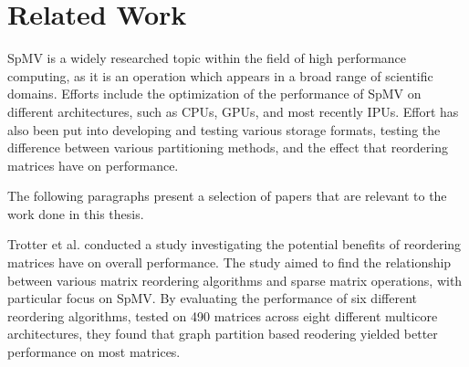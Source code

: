 \chapter{Related Work}
SpMV is a widely researched topic within the field of high performance computing, as it is an operation which appears in a broad range of scientific domains. Efforts include the optimization of the performance of SpMV on different architectures, such as CPUs, GPUs, and most recently IPUs. Effort has also been put into developing and testing various storage formats, testing the difference between various partitioning methods, and the effect that reordering matrices have on performance.
\medskip

The following paragraphs present a selection of papers that are relevant to the work done in this thesis.
\medskip

Trotter et al. \cite{ordersparse} conducted a study investigating the potential benefits of reordering matrices have on overall performance. The study aimed to find the relationship between various matrix reordering algorithms and sparse matrix operations, with particular focus on SpMV. By evaluating the performance of six different reordering algorithms, tested on 490 matrices across eight different multicore architectures, they found that graph partition based reodering yielded better performance on most matrices.
\medskip




